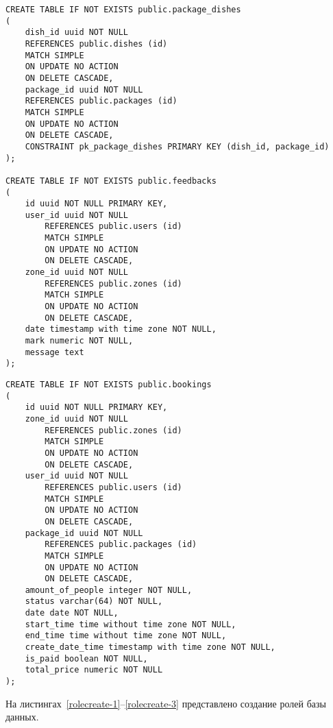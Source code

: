 \clearpage

\begin{center}
	\begin{lstlisting}[label=tablecreate-4, caption=Создание ассоциативной таблицы package\_dishes и таблицы feedbacks]		
CREATE TABLE IF NOT EXISTS public.package_dishes
(
	dish_id uuid NOT NULL 
	REFERENCES public.dishes (id) 
	MATCH SIMPLE
	ON UPDATE NO ACTION
	ON DELETE CASCADE,
	package_id uuid NOT NULL
	REFERENCES public.packages (id) 
	MATCH SIMPLE
	ON UPDATE NO ACTION
	ON DELETE CASCADE,
	CONSTRAINT pk_package_dishes PRIMARY KEY (dish_id, package_id)
);

CREATE TABLE IF NOT EXISTS public.feedbacks
(
	id uuid NOT NULL PRIMARY KEY,
	user_id uuid NOT NULL
		REFERENCES public.users (id) 
		MATCH SIMPLE
		ON UPDATE NO ACTION
		ON DELETE CASCADE,
	zone_id uuid NOT NULL 
		REFERENCES public.zones (id) 
		MATCH SIMPLE
		ON UPDATE NO ACTION
		ON DELETE CASCADE,
	date timestamp with time zone NOT NULL,
	mark numeric NOT NULL,
	message text
);	
	\end{lstlisting}
\end{center}

\clearpage

\begin{center}
	\begin{lstlisting}[label=tablecreate-5, caption=Создание таблицы bookings]		
CREATE TABLE IF NOT EXISTS public.bookings
(
	id uuid NOT NULL PRIMARY KEY,
	zone_id uuid NOT NULL
		REFERENCES public.zones (id) 
		MATCH SIMPLE
		ON UPDATE NO ACTION
		ON DELETE CASCADE,
	user_id uuid NOT NULL
		REFERENCES public.users (id) 
		MATCH SIMPLE
		ON UPDATE NO ACTION
		ON DELETE CASCADE,
	package_id uuid NOT NULL
		REFERENCES public.packages (id) 
		MATCH SIMPLE
		ON UPDATE NO ACTION
		ON DELETE CASCADE,
	amount_of_people integer NOT NULL,
	status varchar(64) NOT NULL,
	date date NOT NULL,
	start_time time without time zone NOT NULL,
	end_time time without time zone NOT NULL,
	create_date_time timestamp with time zone NOT NULL,
	is_paid boolean NOT NULL,
	total_price numeric NOT NULL
);
	\end{lstlisting}
\end{center}

\clearpage

На листингах~\ref{rolecreate-1}--\ref{rolecreate-3} представлено создание ролей базы данных.

